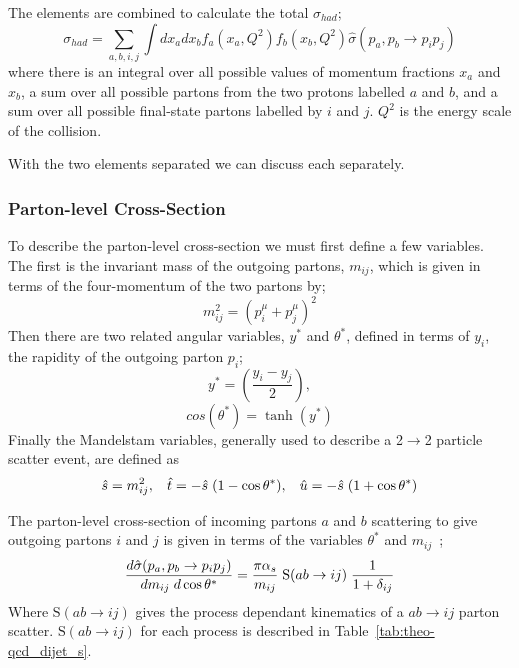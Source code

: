 The elements are combined to calculate the total $\sigma_{had}$;
\begin{equation}
  \sigma_{had} = \sum_{a,b,i,j} \int dx_a dx_b f_a(x_a,Q^2)f_b(x_b,Q^2) \hat{\sigma}(p_a, p_b\to p_i p_j)
\end{equation}
where there is an integral over all possible values of momentum fractions $x_a$ and $x_b$,
a sum over all possible partons from the two protons labelled $a$ and $b$,
and a sum over all possible final-state partons labelled by $i$ and $j$.
$Q^2$ is the energy scale of the collision.

With the two elements separated we can discuss each separately.

\subsubsection{Parton-level Cross-Section}
\label{sec:theo-qcd_dijet_xs}

To describe the parton-level cross-section we must first define a few variables.
The first is the invariant mass of the outgoing partons, $m_{ij}$, which is given in terms of the four-momentum of the two partons by;
\begin{equation}
  m_{ij}^2 = (p^\mu_i + p^\mu_j)^2  
\end{equation}
\noindent
Then there are two related angular variables, $y^*$ and $\theta^*$,
defined in terms of $y_i$, the rapidity of the outgoing parton $p_i$;
\begin{equation}
  y^* = (\frac{y_i - y_j}{2}),
\end{equation}
\begin{equation}
  cos(\theta^*) = \tanh(y^*)
\end{equation}
\noindent
Finally the Mandelstam variables, generally used to describe a 2$\to$2 particle scatter event, are defined as 
\begin{equation}
  \hat{s} = m_{ij}^2, \hspace{3mm}  \hat{t} = -\hat{s}\hspace{1mm}(1 - \cos{\theta^*}), \hspace{3mm} \hat{u} = - \hat{s}\hspace{1mm}(1+\cos{\theta^*})
\end{equation}

\noindent
The parton-level cross-section of incoming partons $a$ and $b$ scattering to give
outgoing partons $i$ and $j$ is given in terms of the variables $\theta^*$ and $m_{ij}$~\cite{theo-dijet_harris};
\begin{equation}
  \frac{d\hat{\sigma}(p_a, p_b \to p_i p_j)}{dm_{ij}\hspace{1mm}d\cos{\theta^*}} = \frac{ \pi \alpha_s}{m_{ij}}\hspace{1mm} \text{S}(ab \to ij) \hspace{1mm} \frac{1}{1+\delta_{ij}}
  \label{eq:theo-qcd_dijet_xs}
\end{equation}
Where $\text{S}(ab \to ij)$ gives the process dependant kinematics of a $ab \to ij$  parton scatter.
$\text{S}(ab \to ij)$ for each process is described in Table~\ref{tab:theo-qcd_dijet_s}.

